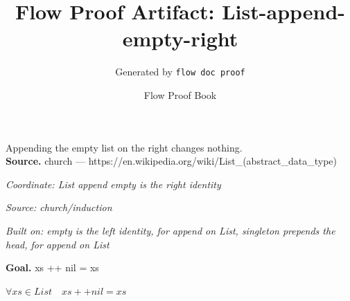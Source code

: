 \documentclass[11pt]{article}
\title{Flow Proof Artifact: List-append-empty-right}
\author{Generated by \texttt{flow doc proof}}
\date{Flow Proof Book}
\theoremstyle{definition}
\begin{document}
\maketitle
Appending the empty list on the right changes nothing.\\[0.5em]
\textbf{Source.} church — https://en.wikipedia.org/wiki/List\_(abstract\_data\_type)\\[0.5em]
\bigskip
{}\par
\smallskip\noindent\textit{Coordinate: List \cdot append \cdot empty is the right identity}\par
\smallskip\noindent\textit{Source: church/induction}\par
\smallskip\noindent\textit{Built on: empty is the left identity, for append on List, singleton prepends the head, for append on List}\par
\medskip
\noindent\textbf{Goal.} xs ++ nil = xs\par
\noindent$\displaystyle \forall xs \in List\quad xs ++ nil = xs$\par
\medskip
\noindent
\end{document}
